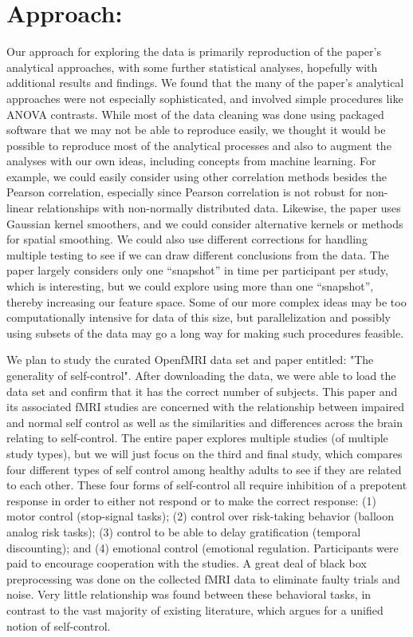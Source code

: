\documentclass[11pt]{article}
\begin{document}
\section{Approach:}
Our approach for exploring the data is primarily reproduction of the paper’s analytical approaches, with some further statistical analyses, hopefully with additional results and findings. We found that the many of the paper’s analytical approaches were not especially sophisticated, and involved simple procedures like ANOVA contrasts. While most of the data cleaning was done using packaged software that we may not be able to reproduce easily, we thought it would be possible to reproduce most of the analytical processes and also to augment the analyses with our own ideas, including concepts from machine learning. For example, we could easily consider using other correlation methods besides the Pearson correlation, especially since Pearson correlation is not robust for non-linear relationships with non-normally distributed data. Likewise, the paper uses Gaussian kernel smoothers, and we could consider alternative kernels or methods for spatial smoothing. We could also use different corrections for handling multiple testing to see if we can draw different conclusions from the data. The paper largely considers only one “snapshot” in time per participant per study, which is interesting, but we could explore using more than one “snapshot”, thereby increasing our feature space. Some of our more complex ideas may be too computationally intensive for data of this size, but parallelization and possibly using subsets of the data may go a long way for making such procedures feasible. 



We plan to study the curated OpenfMRI data set and paper entitled: "The generality of self-control". After downloading the data, we were able to load the data set and confirm that it has the correct number of subjects. This paper and its associated fMRI studies are concerned with the relationship between impaired and normal self control as well as the similarities and differences across the brain relating to self-control. The entire paper explores multiple studies (of multiple study types), but we will just focus on the third and final study, which compares four different types of self control among healthy adults to see if they are related to each other. These four forms of self-control all require inhibition of a prepotent response in order to either not respond or to make the correct response: (1) motor control (stop-signal tasks); (2) control over risk-taking behavior (balloon analog risk tasks); (3) control to be able to delay gratification (temporal discounting); and (4) emotional control (emotional regulation. Participants were paid to encourage cooperation with the studies. A great deal of black box preprocessing was done on the collected fMRI data to eliminate faulty trials and noise. Very little relationship was found between these behavioral tasks, in contrast to the vast majority of existing literature, which argues for a unified notion of self-control.
\end{document}
